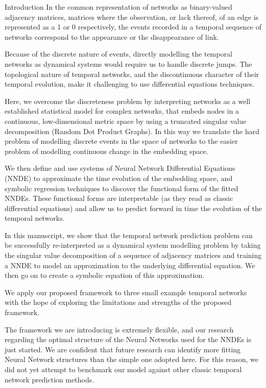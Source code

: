 \documentclass[12pt]{amsart}
\begin{document}
\begin{section}{Introduction}
    In the common representation of networks as binary-valued adjacency matrices, matrices where the observation, or lack thereof, of an edge is represented as a 1 or 0 respectively, the events recorded in a temporal sequence of networks correspond to the appearance or the disappearance of link.
   
    Because of the discrete nature of events, directly modelling the temporal networks as dynamical systems would require us to handle discrete jumps.
    The topological nature of temporal networks, and the discontinuous character of their temporal evolution, make it challenging to use differential equations techniques.

    Here, we overcome the discreteness problem by interpreting networks as a well established statistical model for complex networks, that embeds nodes in a continuous, low-dimensional metric space by using a truncated singular value decomposition (Random Dot Product Graphs\cite{athreya2017statistical}). In this way we translate the hard problem of modelling discrete events in the space of networks to the easier problem of modelling continuous change in the embedding space. 
    
    We then define and use systems of Neural Network Differential Equations (NNDE)\cite{SciML_C_Rak} to approximate the time evolution of the embedding space, and symbolic regression techniques to discover the functional form of the fitted NNDEs. These functional forms are interpretable (as they read as classic differential equations) and allow us to predict forward in time the evolution of the temporal networks.

    In this manuscript, we show that the temporal network prediction problem can be successfully re-interpreted as a dynamical system modelling problem by taking the singular value decomposition of a sequence of adjacency matrices and training a NNDE to model an approximation to the underlying differential equation. We then go on to create a symbolic equation of this approximation. 

    We apply our proposed framework to three small example temporal networks with the hope of exploring the limitations and strengths of the proposed framework. 

    The framework we are introducing is extremely flexible, and our research regarding the optimal structure of the Neural Networks used for the NNDEs is just started.
    We are confident that future research can identify more fitting Neural Network structures than the simple one adopted here.
    For this reason, we did not yet attempt to benchmark our model against other classic temporal network prediction methods.


\end{section}
\end{document}
